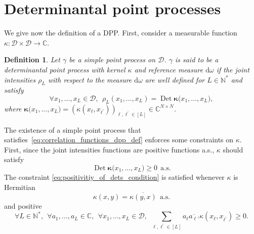 \documentclass[twoside,11pt]{book}
\newtheorem{definition}{Definition}
\numberwithin{theorem}{chapter}
\numberwithin{definition}{chapter}
\numberwithin{proposition}{chapter}
\numberwithin{corollary}{chapter}
\numberwithin{example}{chapter}
\numberwithin{lemma}{chapter}
\numberwithin{assumption}{chapter}
\DeclareMathOperator{\Det}{Det}
\begin{document}








\section{Determinantal point processes}\label{sec:dpp_defs}

We give now the definition of a DPP. First, consider a measurable function $\kappa: \mathcal{D} \times \mathcal{D} \rightarrow \mathbb{C}$.
\begin{definition}
Let $\gamma$ be a simple point process on $\mathcal{D}$. $\gamma$ is said to be a determinantal point process with kernel $\kappa$ and reference measure $\mathrm{d}\omega$ if the joint intensities $\rho_L$ with respect to the measure $\mathrm{d}\omega$ are well defined for $L \in \mathbb{N}^{*}$ and satisfy
\begin{equation}\label{eq:correlation_functions_dpp_def}
\forall x_{1}, \dots, x_{L} \in \mathcal{D}, \:\: \rho_{L}(x_{1}, \dots, x_{L}) = \Det \bm{\kappa}\big( x_{1}, \dots, x_{L} \big),
\end{equation}
where $\bm{\kappa}\big( x_{1}, \dots, x_{L} \big) = (\kappa(x_{\ell},x_{\ell^{'}}))_{\ell,\ell^{'} \in [L]} \in \mathbb{C}^{N \times N}$.

\end{definition}

The existence of a simple point process that satisfies~\eqref{eq:correlation_functions_dpp_def} enforces some constraints on $\kappa$. First, since the joint intensities functions are positive functions a.s., $\kappa$ should satisfy 
\begin{equation}\label{eq:positivitiy_of_dets_condition}
\Det \bm{\kappa}\big(x_{1}, \dots, x_{L} \big) \geq 0 \:\: \text{a.s.} 
\end{equation}
The constraint \eqref{eq:positivitiy_of_dets_condition} is satisfied whenever $\kappa$ is Hermitian
\begin{equation} \label{eq:hermitian_condition_kappa}
\kappa(x,y) = \overline{\kappa(y,x)} \:\: \text{a.s.}  
\end{equation}
and positive
\begin{equation}\label{eq:positivity_condition_kappa}
\forall L \in \mathbb{N}^{*}, \:\:\forall a_{1}, \dots, a_{L} \in \mathbb{C}, \:\:\forall x_{1}, \dots, x_{L} \in \mathcal{D}, \:\: \sum\limits_{\ell,\ell^{'} \in [L]} a_{\ell}\overline{a_{\ell'}} \kappa(x_{\ell},x_{\ell^{'}}) \geq 0.
\end{equation} 
\end{document}
